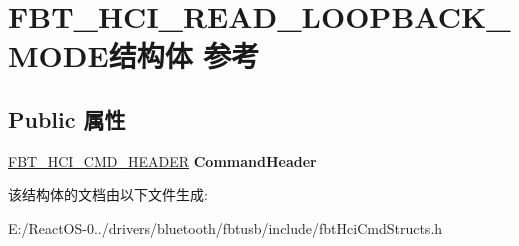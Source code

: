 \hypertarget{struct_f_b_t___h_c_i___r_e_a_d___l_o_o_p_b_a_c_k___m_o_d_e}{}\section{F\+B\+T\+\_\+\+H\+C\+I\+\_\+\+R\+E\+A\+D\+\_\+\+L\+O\+O\+P\+B\+A\+C\+K\+\_\+\+M\+O\+D\+E结构体 参考}
\label{struct_f_b_t___h_c_i___r_e_a_d___l_o_o_p_b_a_c_k___m_o_d_e}
\subsection*{Public 属性}
\begin{DoxyCompactItemize}
\item 
\mbox{\label{struct_f_b_t___h_c_i___r_e_a_d___l_o_o_p_b_a_c_k___m_o_d_e_a99a58e45c30eacc746455fd736ae2727}} 
\hyperlink{struct_f_b_t___h_c_i___c_m_d___h_e_a_d_e_r}{F\+B\+T\+\_\+\+H\+C\+I\+\_\+\+C\+M\+D\+\_\+\+H\+E\+A\+D\+ER} {\bfseries Command\+Header}
\end{DoxyCompactItemize}


该结构体的文档由以下文件生成\+:\begin{DoxyCompactItemize}
\item 
E\+:/\+React\+O\+S-\/0../drivers/bluetooth/fbtusb/include/fbt\+Hci\+Cmd\+Structs.\+h\end{DoxyCompactItemize}
